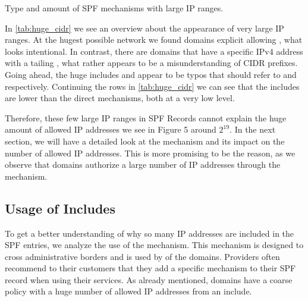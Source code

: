 \begin{table}[htbp]
	\centering
	\caption{Type and amount of SPF mechanisms with large IP ranges.}
	\label{tab:huge_cidr} \small
	
\end{table}

In \autoref{tab:huge_cidr} we see an overview about the appearance of very large IP ranges.
At the hugest possible network  we found \numprint{\AllowInternet} domains explicit allowing , what looks intentional.
In contrast, there are \result{} domains that have a specific IPv4 address with a tailing , what rather appears to be a misunderstanding of CIDR prefixes.
Going ahead, the huge includes  and  appear to be typos that should refer to  and  respectively.
Continuing the rows in \autoref{tab:huge_cidr} we can see that the includes are lower than the direct mechanisms, both at a very low level. 

Therefore, these few large IP ranges in SPF Records cannot explain the huge amount of allowed IP addresses we see in Figure 5 around $2^{19}$.
In the next section, we will have a detailed look at the  mechanism and its impact on the number of allowed IP addresses.
This is more promising to be the reason, as we observe that \numprint{\HugeIncludeDomains} domains authorize a large number of IP addresses through the  mechanism.






\subsection{Usage of Includes}
To get a better understanding of why so many IP addresses are included in the \ac{SPF} entries, we analyze the use of the  mechanism. 
This mechanism is designed to cross administrative borders and is used by \IncludeDomainsPerc of the domains.
Providers often recommend to their customers that they add a specific  mechanism to their \ac{SPF} record when using their services.
As already mentioned, \numprint{\HugeIncludeDomains} domains have a coarse policy with a huge number of allowed IP addresses from an include.

